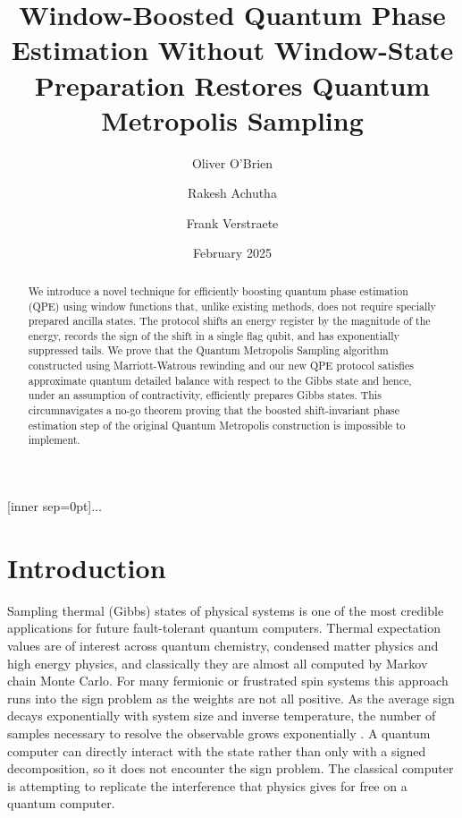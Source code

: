 \documentclass[aps,floatfix,10pt,amssymb,amsfont,amsmath,superscriptaddress,float,nofootinbib,longbibliography,nobalancelastpage,twocolumn]{revtex4-2}
\date{February 2025}
\begin{document}
[inner sep=0pt]{$\dots$}

\title{Window-Boosted Quantum Phase Estimation Without Window-State Preparation Restores Quantum Metropolis Sampling}
\author{Oliver O'Brien}
\author{Rakesh Achutha}
\author{Frank Verstraete}

\begin{abstract}
    We introduce a novel technique for efficiently boosting quantum phase estimation (QPE) using window functions that, unlike existing methods, does not require specially prepared ancilla states. The protocol shifts an energy register by the magnitude of the energy, records the sign of the shift in a single flag qubit, and has exponentially suppressed tails. We prove that the Quantum Metropolis Sampling algorithm constructed using Marriott-Watrous rewinding and our new QPE protocol satisfies approximate quantum detailed balance with respect to the Gibbs state and hence, under an assumption of contractivity, efficiently prepares Gibbs states. This circumnavigates a no-go theorem proving that the boosted shift-invariant phase estimation step of the original Quantum Metropolis construction is impossible to implement.
\end{abstract}

\maketitle

\section{Introduction}
Sampling thermal (Gibbs) states of physical systems is one of the most credible applications for future fault-tolerant quantum computers. Thermal expectation values are of interest across quantum chemistry, condensed matter physics and high energy physics, and classically they are almost all computed by Markov chain Monte Carlo. For many fermionic or frustrated spin systems this approach runs into the sign problem as the weights are not all positive. As the average sign decays exponentially with system size and inverse temperature, the number of samples necessary to resolve the observable grows exponentially \cite{Troyer_2005}. A quantum computer can directly interact with the state rather than only with a signed decomposition, so it does not encounter the sign problem. The classical computer is attempting to replicate the interference that physics gives for free on a quantum computer.
\end{document}
